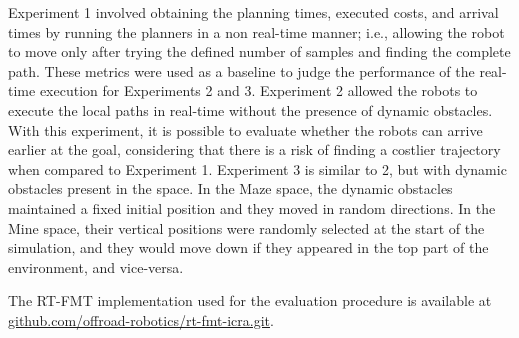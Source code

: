 Experiment 1 involved obtaining the planning times, executed costs, and arrival times by running the planners in a non real-time manner; i.e., allowing the robot to move only after trying the defined number of samples and finding the complete path. These metrics were used as a baseline to judge the performance of the real-time execution for Experiments 2 and 3. Experiment 2 allowed the robots to execute the local paths in real-time without the presence of dynamic obstacles. With this experiment, it is possible to evaluate whether the robots can arrive earlier at the goal, considering that there is a risk of finding a costlier trajectory when compared to Experiment 1. Experiment 3 is similar to 2, but with dynamic obstacles present in the space. In the Maze space, the dynamic obstacles maintained a fixed initial position and they moved in random directions. In the Mine space, their vertical positions were randomly selected at the start of the simulation, and they would move down if they appeared in the top part of the environment, and vice-versa.

The RT-FMT implementation used for the evaluation procedure is available at \url{github.com/offroad-robotics/rt-fmt-icra.git}.



